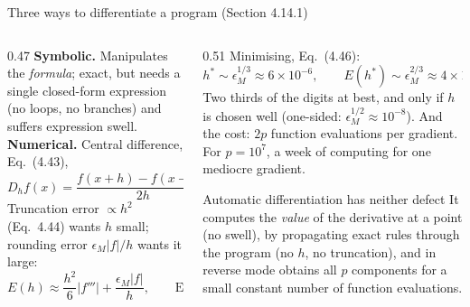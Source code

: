 \documentclass[10pt,aspectratio=169]{beamer}
\begin{document}
\begin{frame}{Three ways to differentiate a program (Section 4.14.1)}
\begin{columns}
\begin{column}{0.47\textwidth}
\textbf{Symbolic.}  Manipulates the \emph{formula}; exact, but needs a single
closed-form expression (no loops, no branches) and suffers expression swell.
\vspace{4pt}
\textbf{Numerical.}  Central difference, Eq.~(4.43),
\[
  D_hf(x)=\frac{f(x+h)-f(x-h)}{2h}=f'(x)+\frac{h^2}{6}f'''(x)+\dots
\]
Truncation error $\propto h^2$ (Eq.~4.44) wants $h$ small; rounding error
$\epsilon_M|f|/h$ wants it large:
\[
  E(h)\approx\frac{h^2}{6}|f'''|+\frac{\epsilon_M|f|}{h},\qquad\text{Eq.~(4.45)}.
\]
\end{column}
\begin{column}{0.51\textwidth}
Minimising, Eq.~(4.46):
\[
  h^*\sim\epsilon_M^{1/3}\approx6\times10^{-6},\qquad
  E(h^*)\sim\epsilon_M^{2/3}\approx4\times10^{-11}.
\]
Two thirds of the digits at best, and only if $h$ is chosen well
(one-sided: $\epsilon_M^{1/2}\approx10^{-8}$).  And the cost: $2p$ function
evaluations per gradient.  For $p=10^7$, a week of computing for one
mediocre gradient.
\vspace{4pt}
\begin{block}{Automatic differentiation has neither defect}
It computes the \emph{value} of the derivative at a point (no swell), by
propagating exact rules through the program (no $h$, no truncation), and in
reverse mode obtains all $p$ components for a small constant number of
function evaluations.
\end{block}
\end{column}
\end{columns}
\end{frame}
\end{document}

